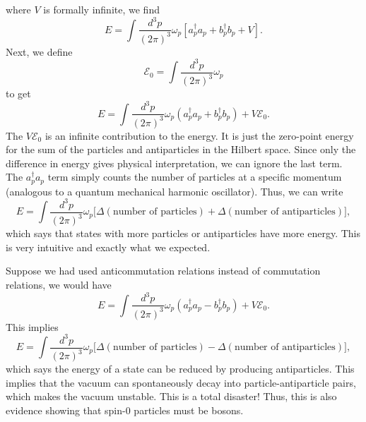\documentclass[11pt]{article}
\theoremstyle{definition}
\begin{document}
where $V$ is formally infinite, we find
\begin{equation}
    E = \int \frac{d^3p}{(2\pi)^3} \omega_p[a_p^\dagger a_p + b_p^\dagger b_p + V].
\end{equation}
Next, we define 
\begin{equation}
    \mathcal{E}_0 = \int \frac{d^3p}{(2\pi)^3} \omega_p
\end{equation}
to get
\begin{equation}
    E = \int \frac{d^3p}{(2\pi)^3} \omega_p(a_p^\dagger a_p + b_p^\dagger b_p) + V\mathcal{E}_0.
\end{equation}
The $V\mathcal{E}_0$ is an infinite contribution to the energy. It is just the zero-point energy for the sum of the particles and antiparticles in the Hilbert space. Since only the difference in energy gives physical interpretation, we can ignore the last term. The $a_p^\dagger a_p$ term simply counts the number of particles at a specific momentum (analogous to a quantum mechanical harmonic oscillator). Thus, we can write
\begin{equation}
    E = \int \frac{d^3p}{(2\pi)^3} \omega_p\bigg[\Delta(\text{number of particles}) + \Delta(\text{number of antiparticles})\bigg],
\end{equation}
which says that states with more particles or antiparticles have more energy. This is very intuitive and exactly what we expected. 

Suppose we had used anticommutation relations instead of commutation relations, we would have
\begin{equation}
    E = \int \frac{d^3p}{(2\pi)^3} \omega_p(a_p^\dagger a_p - b_p^\dagger b_p) + V\mathcal{E}_0.
\end{equation}
This implies
\begin{equation}
    E = \int \frac{d^3p}{(2\pi)^3} \omega_p\bigg[\Delta(\text{number of particles}) - \Delta(\text{number of antiparticles})\bigg],
\end{equation}
which says the energy of a state can be reduced by producing antiparticles. This implies that the vacuum can spontaneously decay into particle-antiparticle pairs, which makes the vacuum unstable. This is a total disaster! Thus, this is also evidence showing that spin-0 particles must be bosons.
\end{document}
